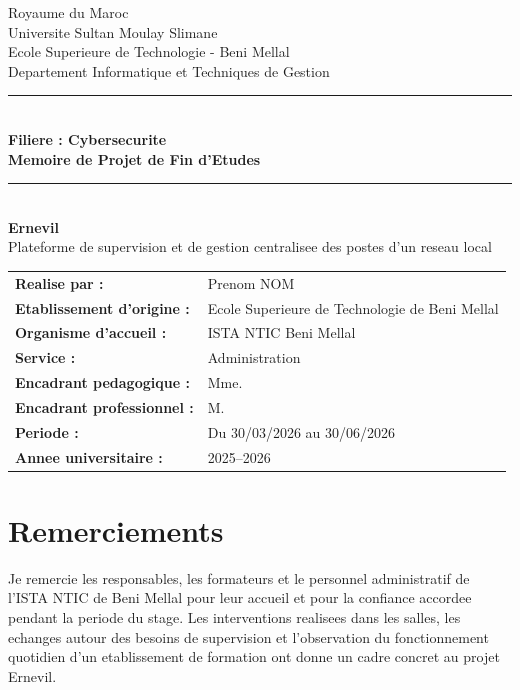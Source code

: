 \documentclass[12pt,a4paper]{report}
\begin{document}
\begin{titlepage}
  \begin{center}
    {\large Royaume du Maroc}\\[2mm]
    {\large Universite Sultan Moulay Slimane}\\[2mm]
    {\large Ecole Superieure de Technologie - Beni Mellal}\\[2mm]
    {\large Departement Informatique et Techniques de Gestion}\\[2mm]
    \rule{\linewidth}{0.65pt}\\[9mm]
    {\Large\bfseries Filiere : Cybersecurite}\\[5mm]
    {\Large\bfseries Memoire de Projet de Fin d'Etudes}\\[8mm]
    \rule{0.70\linewidth}{1.2pt}\\[9mm]
    {\Huge\bfseries Ernevil}\\[4mm]
    {\Large Plateforme de supervision et de gestion centralisee des postes d'un reseau local}\\[12mm]
    \begin{tabular}{ll}
      \textbf{Realise par :} & Prenom NOM \\[4mm]
      \textbf{Etablissement d'origine :} & Ecole Superieure de Technologie de Beni Mellal \\[4mm]
      \textbf{Organisme d'accueil :} & ISTA NTIC Beni Mellal \\[4mm]
      \textbf{Service :} & Administration \\[4mm]
      \textbf{Encadrant pedagogique :} & Mme. \dotfill \\[4mm]
      \textbf{Encadrant professionnel :} & M. \dotfill \\[4mm]
      \textbf{Periode :} & Du 30/03/2026 au 30/06/2026 \\[4mm]
      \textbf{Annee universitaire :} & 2025--2026
    \end{tabular}
  \end{center}
\end{titlepage}

\chapter*{Remerciements}
Je remercie les responsables, les formateurs et le personnel administratif de l'ISTA NTIC de Beni Mellal pour leur accueil et pour la confiance accordee pendant la periode du stage. Les interventions realisees dans les salles, les echanges autour des besoins de supervision et l'observation du fonctionnement quotidien d'un etablissement de formation ont donne un cadre concret au projet Ernevil.
\end{document}
